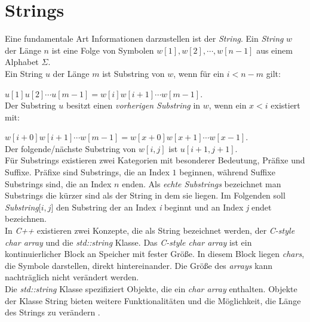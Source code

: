 \section{Strings}
Eine fundamentale Art Informationen darzustellen ist der \emph{String}.
Ein \emph{String} $w$ der Länge $n$ ist eine Folge von Symbolen $w[1],w[2],\cdots ,w[n-1]$ aus einem Alphabet $\Sigma$.\\
Ein String $u$ der Länge $m$ ist Substring von $w$, wenn für ein $i<n-m$ gilt:

$u[1]u[2] \cdots u[m-1] = w[i]w[i+1] \cdots w[m-1]$.\\
Der Substring  $u$ besitzt einen \emph{vorherigen Substring} in $w$, wenn ein $x<i$ existiert mit:

$w[i+0]w[i+1] \cdots w[m-1] = w[x+0]w[x+1] \cdots w[x-1]$.\\
Der folgende/nächste Substring von $w[i,j]$ ist $u[i+1,j+1]$.\\
Für Substrings  existieren zwei Kategorien mit besonderer Bedeutung, Präfixe und Suffixe.
Präfixe sind Substrings, die an Index $1$ beginnen, während Suffixe Substrings  sind, die an Index $n$ enden.
Als \emph{echte Substrings}  bezeichnet man Substrings  die kürzer sind als der String  in dem sie liegen.
Im Folgenden soll \emph{Substring}[$i,j$] den Substring  der an Index \textit{i} beginnt und an Index \textit{j} endet bezeichnen.\\
In \textit{C++} existieren zwei Konzepte, die als String  bezeichnet werden, der \textit{C-style char array} und die \textit{std::string} Klasse.
Das \textit{C-style char array} ist ein kontinuierlicher Block an Speicher mit fester Größe. In diesem Block liegen \textit{chars}, die Symbole darstellen, direkt hintereinander. Die Größe des \textit{arrays} kann nachträglich nicht verändert werden.\\
Die \textit{std::string} Klasse spezifiziert Objekte, die ein \textit{char array} enthalten. Objekte der Klasse String  bieten weitere Funktionalitäten und die Möglichkeit, die Länge des Strings  zu verändern \cite{cplusplus}.

